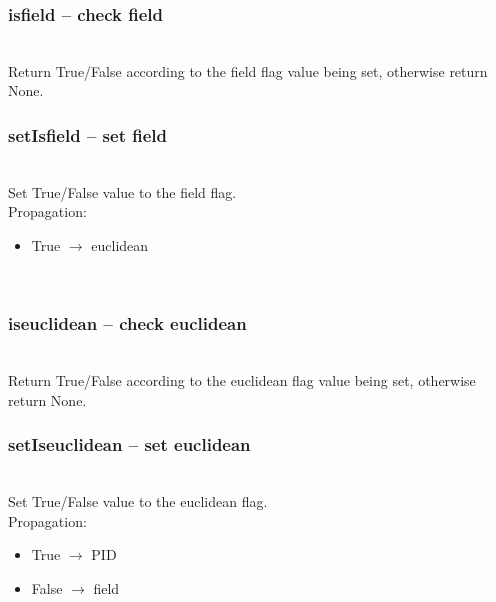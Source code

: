   \subsubsection{isfield -- check field}
   \\
   \spacing
   \quad Return True/False according to the field flag value being set,
        otherwise return None.\\
   \spacing
  \subsubsection{setIsfield -- set field}
   \\
   \spacing
   \quad Set True/False value to the field flag.\\
   Propagation:
   \begin{itemize}
     \item True $\to$ euclidean\\
   \end{itemize}
   \quad\\
   \spacing
  \subsubsection{iseuclidean -- check euclidean}
   \\
   \spacing
   \quad Return True/False according to the euclidean flag value being set,
        otherwise return None.\\
   \spacing
  \subsubsection{setIseuclidean -- set euclidean}
   \\
   \spacing
   \quad Set True/False value to the euclidean flag.\\
   Propagation:
   \begin{itemize}
    \item True $\to$ PID\\
    \item False $\to$ field\\
   \end{itemize}
   \quad\\
   \spacing
